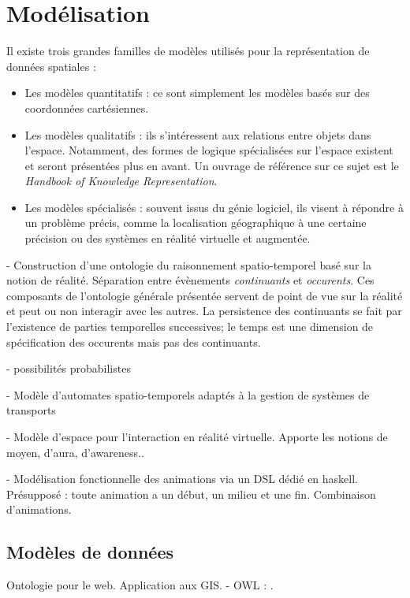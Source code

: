 \documentclass[french,12pt]{article}
\begin{document}
\section{Modélisation}
Il existe trois grandes familles de modèles utilisés pour la représentation de données spatiales : 
\begin{itemize}
\item Les modèles quantitatifs : ce sont simplement les modèles basés sur des coordonnées cartésiennes. 
\item Les modèles qualitatifs : ils s'intéressent aux relations entre objets dans l'espace. Notamment, des formes de logique spécialisées sur l'espace existent et seront présentées plus en avant. Un ouvrage de référence sur ce sujet est le \textit{Handbook of Knowledge Representation}\cite{porter_handbook_2008}.
\item Les modèles spécialisés : souvent issus du génie logiciel, ils visent à répondre à un problème précis, comme la localisation géographique à une certaine précision ou des systèmes en réalité virtuelle et augmentée.
\end{itemize}

- Construction d'une ontologie du raisonnement spatio-temporel basé sur la notion de réalité. Séparation entre évènements \textit{continuants} et \textit{occurents}. Ces composants de l'ontologie générale présentée servent de point de vue sur la réalité et peut ou non interagir avec les autres. La persistence des continuants se fait par l'existence de parties temporelles successives; le temps est une dimension de spécification des occurents mais pas des continuants.
\cite{grenon_formal_2003}

- possibilités probabilistes

- Modèle d'automates spatio-temporels adaptés à la gestion de systèmes de transports %
\cite{zhang_timed_2014}

- Modèle d'espace pour l'interaction en réalité virtuelle. Apporte les notions de moyen, d'aura, d'awareness..
\cite{benford_spatial_1993}

- Modélisation fonctionnelle des animations via un DSL dédié en haskell. Présupposé : toute animation a un début, un milieu et une fin. Combinaison d'animations.
\cite{matlage_every_2011}

\subsection{Modèles de données}
Ontologie pour le web. Application aux \ac{GIS}.
- OWL : \cite{mefteh_approche_2013}.
\end{document}
